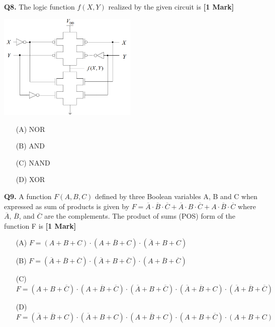 \documentclass[11pt]{article}
\newcommand{\questiona}[2]{
    \noindent\textbf{Q#2.} #1 \hfill \textbf{[1 Mark]}
}
\begin{document}
\vspace{0.5cm}

\questiona{The logic function $f(X,Y)$ realized by the given circuit is}{8}
\begin{center}
\includegraphics[width=0.5\textwidth]{figures/8.png}
\end{center}
\begin{enumerate}
    \item[(A)] NOR
    \item[(B)] AND
    \item[(C)] NAND
    \item[(D)] XOR
\end{enumerate}

\vspace{0.5cm}

\questiona{A function $F(A,B,C)$ defined by three Boolean variables A, B and C when expressed as sum of products is given by $F= \overline{A}\cdot\overline{B}\cdot\overline{C} + \overline{A}\cdot B\cdot\overline{C} + A\cdot\overline{B}\cdot\overline{C}$ where $\overline{A}$, $\overline{B}$, and $\overline{C}$ are the complements. The product of sums (POS) form of the function F is}{9}
\begin{enumerate}
    \item[(A)] $F= (A+ B+ C)\cdot(A+ \overline{B} + C)\cdot(\overline{A} + B+ C)$
    \item[(B)] $F= (\overline{A} + \overline{B} + \overline{C})\cdot(\overline{A} + B+ \overline{C})\cdot(A + \overline{B} + \overline{C})$
    \item[(C)] $F= (A+ B+ \overline{C})\cdot(A+ \overline{B} + \overline{C})\cdot(\overline{A} + B+ \overline{C})\cdot(\overline{A} + \overline{B} + C)\cdot(\overline{A} + \overline{B} + \overline{C})$
    \item[(D)] $F= (\overline{A} + \overline{B} + C)\cdot(\overline{A} + B+ C)\cdot(A + \overline{B} + C)\cdot(A+ B+ \overline{C})\cdot(A+ B+ C)$
\end{enumerate}
\end{document}
